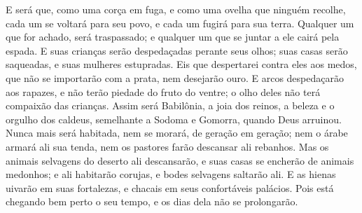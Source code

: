 {  E será que, como uma corça em fuga, e como uma ovelha que ninguém recolhe, cada um se voltará para seu povo, e cada um fugirá para sua terra.
  Qualquer um que for achado, será traspassado; e qualquer um que se juntar a ele cairá pela espada.
  E suas crianças serão despedaçadas perante seus olhos; suas casas serão saqueadas, e suas mulheres estupradas.
  Eis que despertarei contra eles aos medos, que não se importarão com a prata, nem desejarão ouro.
  E
{} arcos despedaçarão aos rapazes, e não terão piedade do fruto do ventre; o olho deles não terá compaixão das crianças.
  Assim será Babilônia, a joia dos reinos, a beleza e o orgulho dos caldeus, semelhante a Sodoma e Gomorra, quando Deus
{} arruinou.
  Nunca mais será habitada, nem
{} se morará, de geração em geração; nem o árabe armará ali sua tenda, nem os pastores farão descansar ali
{} rebanhos.
  Mas os animais selvagens do deserto ali descansarão, e suas casas se encherão de animais medonhos; e ali habitarão corujas,
 e bodes selvagens saltarão ali.
  E as hienas uivarão em suas fortalezas, e chacais em seus confortáveis palácios. Pois está chegando bem perto o seu tempo, e os dias dela não se prolongarão.
\par }

